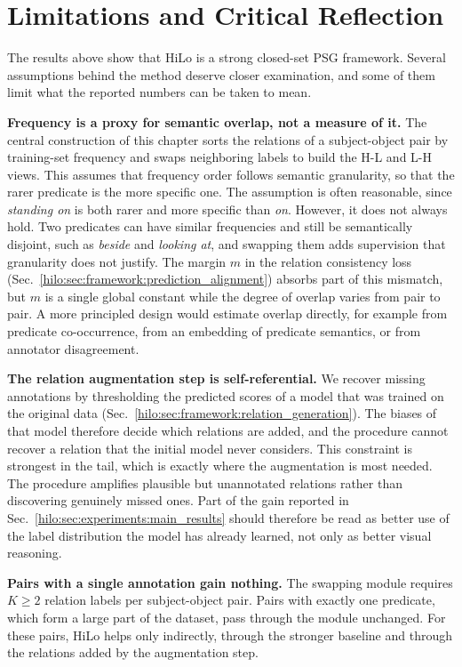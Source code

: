 \section{Limitations and Critical Reflection}
\label{hilo:sec:limitations}
The results above show that HiLo is a strong closed-set PSG framework. Several assumptions behind the method deserve closer examination, and some of them limit what the reported numbers can be taken to mean.

\noindent \textbf{Frequency is a proxy for semantic overlap, not a measure of it.}
The central construction of this chapter sorts the relations of a subject-object pair by training-set frequency and swaps neighboring labels to build the H-L and L-H views. This assumes that frequency order follows semantic granularity, so that the rarer predicate is the more specific one. The assumption is often reasonable, since \textit{standing on} is both rarer and more specific than \textit{on}. However, it does not always hold. Two predicates can have similar frequencies and still be semantically disjoint, such as \textit{beside} and \textit{looking at}, and swapping them adds supervision that granularity does not justify. The margin $m$ in the relation consistency loss (Sec.~\ref{hilo:sec:framework:prediction_alignment}) absorbs part of this mismatch, but $m$ is a single global constant while the degree of overlap varies from pair to pair. A more principled design would estimate overlap directly, for example from predicate co-occurrence, from an embedding of predicate semantics, or from annotator disagreement.

\noindent \textbf{The relation augmentation step is self-referential.}
We recover missing annotations by thresholding the predicted scores of a model that was trained on the original data (Sec.~\ref{hilo:sec:framework:relation_generation}). The biases of that model therefore decide which relations are added, and the procedure cannot recover a relation that the initial model never considers. This constraint is strongest in the tail, which is exactly where the augmentation is most needed. The procedure amplifies plausible but unannotated relations rather than discovering genuinely missed ones. Part of the gain reported in Sec.~\ref{hilo:sec:experiments:main_results} should therefore be read as better use of the label distribution the model has already learned, not only as better visual reasoning.

\noindent \textbf{Pairs with a single annotation gain nothing.}
The swapping module requires $K \geq 2$ relation labels per subject-object pair. Pairs with exactly one predicate, which form a large part of the dataset, pass through the module unchanged. For these pairs, HiLo helps only indirectly, through the stronger baseline and through the relations added by the augmentation step.

